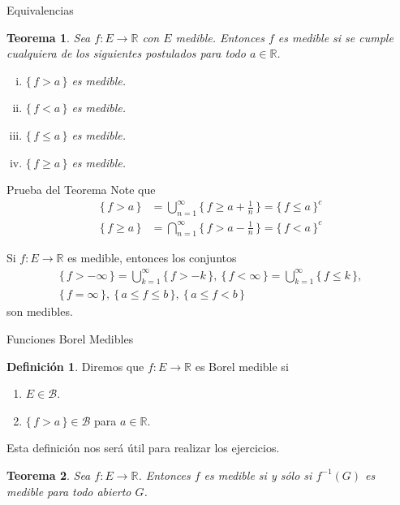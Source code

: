 \documentclass[utf8]{beamer}
\theoremstyle{plain}
\newtheorem{Th}{Teorema}               %
\theoremstyle{definition}
\newtheorem{Def}{Definición}           %
\theoremstyle{remark}
\numberwithin{equation}{section}
\newcommand{\bR}{\mathbb{R}}    %
\newcommand{\cB}{\mathcal{B}}           %
\newcommand{\set}[1]{\{\,#1\,\}}    %
\newcommand{\Set}[1]{\biggl\{\,#1\,\biggr\}} %
\renewcommand{\geq}{\geqslant}          %
\renewcommand{\leq}{\leqslant}          %
\newcommand{\suck}{_{k=1}^\infty} %
\newcommand{\sucn}{_{n=1}^\infty} %
\renewcommand{\.}{\Cdot}                %
\begin{document}
\begin{frame}{Equivalencias}
  \begin{Th}\label{th:equivsMedib}
    Sea $f:E\to\bR$ con $E$ medible. Entonces $f$ es medible si se cumple cualquiera de los siguientes postulados para todo $a\in\bR$.
    \begin{enumerate}[(i)]
      \item $\set{f>a}$ es medible.
      \item $\set{f<a}$ es medible.
      \item $\set{f\leq a}$ es medible.
      \item $\set{f\geq a}$ es medible.
    \end{enumerate}
  \end{Th}
\end{frame}

\begin{frame}{Prueba del Teorema}
  Note que
  \begin{align*}
    \set{f>a}&=\bigcup\sucn \Set{f\geq a+\frac1n}=\set{f\leq a}^c\\
    \set{f\geq a}&=\bigcap\sucn \Set{f> a-\frac1n}=\set{f< a}^c
  \end{align*}
\end{frame}

\begin{frame}
  Si $f: E\to\bR$ es medible, entonces los conjuntos
  \begin{gather*}
    \set{f>-\infty}=\bigcup\suck\set{f>-k},\ \set{f<\infty}=\bigcup\suck\set{f\leq k},\\
    \set{f=\infty},\ \set{a\leq f\leq b},\ \set{a\leq f<b}
  \end{gather*}
  son medibles.
\end{frame}

\begin{frame}{Funciones Borel Medibles}
  \begin{Def}\label{def:funcBorelMedible}
    Diremos que $f:E\to\bR$ es \alert{Borel medible} si 
    \begin{enumerate}
      \item $E\in\cB$.
      \item $\set{f>a}\in\cB$ para $a\in\bR$. 
    \end{enumerate}
  \end{Def}
  Esta definición nos será útil para realizar los ejercicios.
  \begin{Th}\label{th:caracMedibAbiertos}
    Sea $f:E\to\bR$. Entonces $f$ es medible si y sólo si $f^{-1}(G)$ es medible para todo abierto $G$.
  \end{Th}
\end{frame}
\end{document}
